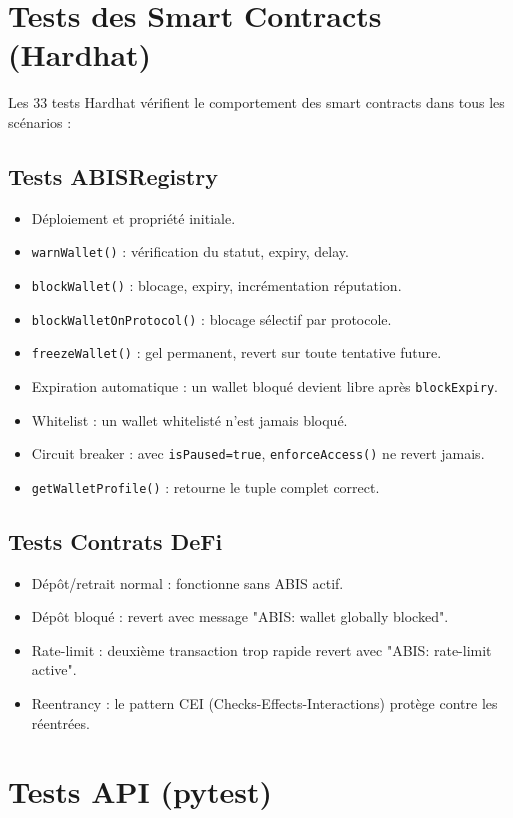 \documentclass[12pt,a4paper]{report}
\newcommand{\code}[1]{\texttt{#1}}
\begin{document}
\section{Tests des Smart Contracts (Hardhat)}

Les 33 tests Hardhat vérifient le comportement des smart contracts dans tous les scénarios :

\subsection{Tests ABISRegistry}
\begin{itemize}
  \item Déploiement et propriété initiale.
  \item \code{warnWallet()} : vérification du statut, expiry, delay.
  \item \code{blockWallet()} : blocage, expiry, incrémentation réputation.
  \item \code{blockWalletOnProtocol()} : blocage sélectif par protocole.
  \item \code{freezeWallet()} : gel permanent, revert sur toute tentative future.
  \item Expiration automatique : un wallet bloqué devient libre après \code{blockExpiry}.
  \item Whitelist : un wallet whitelisté n'est jamais bloqué.
  \item Circuit breaker : avec \code{isPaused=true}, \code{enforceAccess()} ne revert jamais.
  \item \code{getWalletProfile()} : retourne le tuple complet correct.
\end{itemize}

\subsection{Tests Contrats DeFi}
\begin{itemize}
  \item Dépôt/retrait normal : fonctionne sans ABIS actif.
  \item Dépôt bloqué : revert avec message "ABIS: wallet globally blocked".
  \item Rate-limit : deuxième transaction trop rapide revert avec "ABIS: rate-limit active".
  \item Reentrancy : le pattern CEI (Checks-Effects-Interactions) protège contre les réentrées.
\end{itemize}

\section{Tests API (pytest)}
\end{document}
